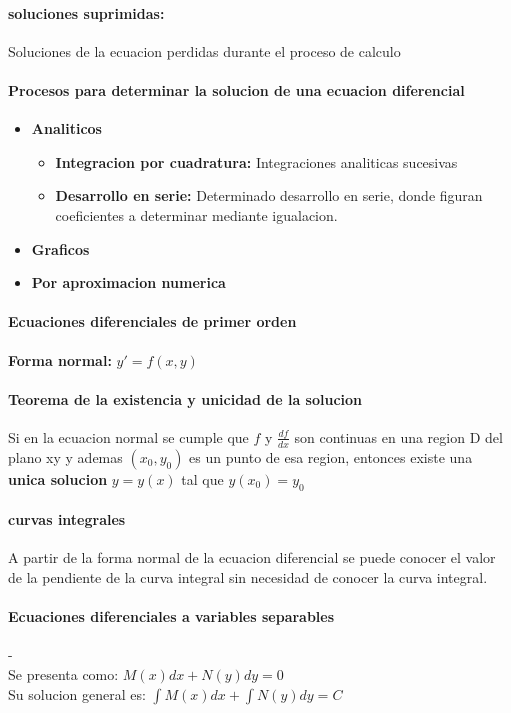 \documentclass[11pt]{article}
\begin{document}
\paragraph{soluciones suprimidas:} Soluciones de la ecuacion perdidas durante el proceso de calculo
\paragraph{Procesos para determinar la solucion de una ecuacion diferencial}
\begin{itemize}
	\item \textbf{Analiticos}
	\begin{itemize}
		\item \textbf{Integracion por cuadratura:} Integraciones analiticas sucesivas
		\item \textbf{Desarrollo en serie:} Determinado desarrollo en serie, donde figuran coeficientes a determinar mediante igualacion.
	\end{itemize}
	\item \textbf{Graficos}
	\item \textbf{Por aproximacion numerica}
\end{itemize}
\paragraph{Ecuaciones diferenciales de primer orden}
\textbf{Forma normal:} $y' = f(x,y)$
\paragraph{Teorema de la existencia y unicidad de la solucion}
Si en la ecuacion normal se cumple que $f$ y $\frac{df}{dx}$ son continuas en una region D del plano xy y ademas $(x_0,y_0)$ es un punto de esa region, entonces existe una \textbf{unica solucion} $y = y(x)$ tal que $y(x_0) = y_0$
\paragraph{curvas integrales} A partir de la forma normal de la ecuacion diferencial se puede conocer el valor de la pendiente de la curva integral sin necesidad de conocer la curva integral.
\paragraph{Ecuaciones diferenciales a variables separables}-\\
Se presenta como: $M(x)dx+N(y)dy = 0$\\
Su solucion general es: $\int M(x)dx + \int N(y)dy = C$
\end{document}
